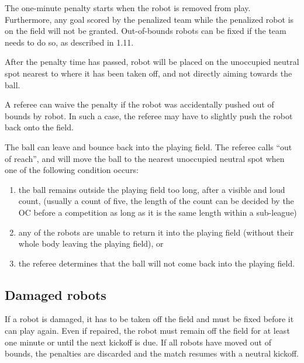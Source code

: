 \documentclass{article}
\begin{document}
The one-minute penalty starts when the robot is removed from play. Furthermore,
any goal scored by the penalized team while the penalized robot is on the field
will not be granted. Out-of-bounds robots can be fixed if the team needs to do
so, as described in 1.11.

After the penalty time has passed, robot will be placed on the unoccupied
neutral spot nearest to where it has been taken off, and not directly aiming
towards the ball. 

A referee can waive the penalty if the robot was accidentally pushed out of
bounds by  robot. In such a case, the
referee may have to slightly push the robot back onto the field.

The ball can leave and bounce back into the playing field. The referee calls
``out of reach'', and will move the ball to the nearest unoccupied neutral spot
when one of the following condition occurs:

\begin{enumerate}
    \item the ball remains outside the playing field too long,
        after a visible and loud count, (usually a count of five, the length of
        the count can be decided by the OC before a competition as long as it
        is the same length within a sub-league)

    \item any of the robots are unable to return it into the playing field
        (without their whole body leaving the playing field), or

    \item the referee determines that the ball will not come back into the
        playing field.

\end{enumerate}

\subsection{Damaged robots \label{ref-012}}

If a robot is damaged, it has to be taken off the field and must be fixed
before it can play again. Even if repaired, the robot must remain off the field
for at least one minute or until the next kickoff is due. If all robots have
moved out of bounds, the penalties are discarded and the match resumes with a
neutral kickoff.
\end{document}

